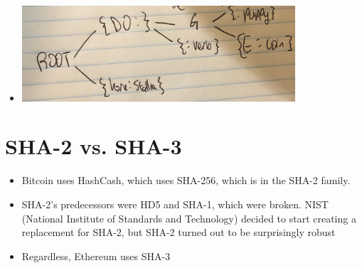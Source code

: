 \documentclass{article}
\begin{document}
\begin{itemize}
\begin{lstlisting}
    E:['\x17', F  ]
    F:['', '', '', '', '', '', G, '', '', '', '', '', '', '', '', '', 'puppy']
    G:['\x35', 'coin']
    C:['\x20\x6f\x72\x73\x65', 'stallion']
    \end{lstlisting}
  \item \includegraphics[width=4in]{patriciaex.png}
\end{itemize}

\section*{SHA-2 vs. SHA-3}
\begin{itemize}
  \item Bitcoin uses HashCash, which uses SHA-256, which is in the SHA-2 family. 
  \item SHA-2's predecessors were HD5 and SHA-1, which were broken. NIST (National Institute of Standards and Technology) decided to start creating a replacement for SHA-2, 
    but SHA-2 turned out to be surprisingly robust
  \item Regardless, Ethereum uses SHA-3
\end{itemize}
\end{document}
